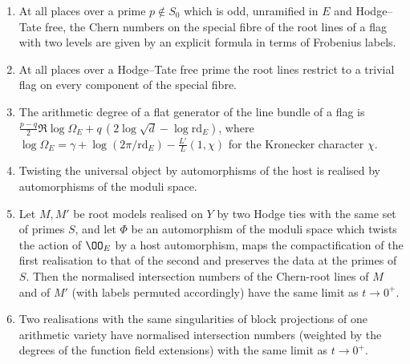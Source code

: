 \begin{definition}
\begin{enumerate}[label=(\roman*)]
  at most $C_ufj'\Lambda(B)$ (here $f=|\Psi|$ and $j'=N-j$).
\item[$(\mathrm{H}_4)$] At all places over a prime $p\notin S_0$ which is odd, unramified in $E$ and Hodge--Tate
  free, the Chern numbers on the special fibre of the root lines of a flag with two levels are given by an
  explicit formula in terms of Frobenius labels.
\item[$(\mathrm{H}_5)$] At all places over a Hodge--Tate free prime the root lines restrict to a trivial flag on
  every component of the special fibre.
\item[$(\mathrm{H}_6)$] The arithmetic degree of a flat generator of the line bundle of a flag is
  $\frac{p-q}2\Re\log\Omega_E+q\,(2\log\sqrt d-\log\mathrm{rd}_E)$, where
  $\log\Omega_E=\gamma+\log(2\pi/\mathrm{rd}_E)-\frac{L'}{L}(1,\chi)$ for the Kronecker character $\chi$.
\item[$(\mathrm{H}_7)$] Twisting the universal object by automorphisms of the host is realised by automorphisms of
  the moduli space.
\item[$(\mathrm{H}_8)$] Let $M,M'$ be root models realised on $Y$ by two Hodge ties with the same set of primes
  $S$, and let $\Phi$ be an automorphism of the moduli space which twists the action of $\OO_E$ by a host
  automorphism, maps the compactification of the first realisation to that of the second and preserves the data
  at the primes of $S$. Then the normalised intersection numbers of the Chern-root lines of $M$ and of $M'$ (with
  labels permuted accordingly) have the same limit as $t\to0^+$.
\item[$(\mathrm{H}_9)$] Two realisations with the same singularities of block projections of one arithmetic
  variety have normalised intersection numbers (weighted by the degrees of the function field extensions) with
  the same limit as $t\to0^+$.
\end{enumerate}
\end{definition}

